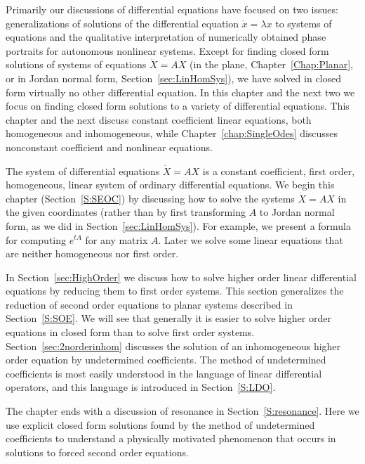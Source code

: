 \label{C:LDE}

\normalsize

Primarily our discussions of differential equations have focused on 
two issues: generalizations of solutions of the differential equation 
$\dot{x}=\lambda x$ to systems of equations and the qualitative 
interpretation of numerically obtained phase portraits for autonomous
nonlinear systems.   Except for finding closed form solutions of 
systems of equations $\dot{X}=AX$ (in the plane, Chapter~\ref{Chap:Planar}, 
or in Jordan normal form, Section~\ref{sec:LinHomSys}), we have solved in 
closed form virtually no other differential equation.  In this chapter and 
the next two we focus on finding closed form solutions to a variety of 
differential equations.  This chapter and the next discuss constant 
coefficient linear equations, both homogeneous and inhomogeneous, 
while Chapter~\ref{chap:SingleOdes} discusses nonconstant coefficient
and nonlinear equations.  

The system of differential equations $\dot{X}=AX$ is a constant coefficient, 
first order, homogeneous, linear system of ordinary differential equations. 
We begin this chapter (Section~\ref{S:SEOC}) by discussing how to solve 
the systems $\dot{X}=AX$ in the given coordinates (rather than by first 
transforming $A$ to Jordan normal form, as we did in 
Section~\ref{sec:LinHomSys}).  For example, we present a formula for 
computing $e^{tA}$ for any matrix $A$.  Later we solve some linear 
equations that are neither homogeneous nor first order.   

In Section~\ref{sec:HighOrder} we discuss how to solve higher order 
linear differential equations by reducing them to first order systems.  
This section generalizes the reduction of second order equations to planar
systems described in Section~\ref{S:SOE}.  We will see that generally it is 
easier to solve higher order equations in closed form than to solve first 
order systems.  Section~\ref{sec:2norderinhom} discusses the solution of an 
inhomogeneous higher order equation by undetermined coefficients.  The method 
of undetermined coefficients is most easily understood in the language of 
linear differential operators, and this language is introduced in 
Section~\ref{S:LDO}.

The chapter ends with a discussion of resonance in Section~\ref{S:resonance}. 
Here we use explicit closed form solutions found by the method of 
undetermined coefficients to understand a physically motivated phenomenon 
that occurs in solutions to forced second order equations.  


